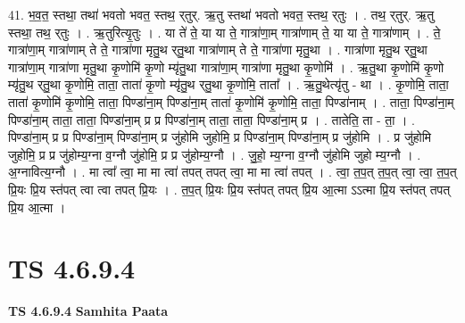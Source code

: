 \documentclass[17pt]{extarticle}
\begin{document}
41. भ॒व॒त॒ स्तथा॒ तथा॑ भवतो भवत॒ स्तथ॒ र्‌तुर्. ऋ॒तु स्तथा॑ भवतो भवत॒ स्तथ॒ र्‌तुः । . तथ॒ र्‌तुर्. ऋ॒तु स्तथा॒ तथ॒ र्‌तुः । . ऋ॒तुरित्यृ॒तुः । . या ते॑ ते॒ या या ते॒ गात्रा॑णा॒म् गात्रा॑णाम् ते॒ या या ते॒ गात्रा॑णाम् । . ते॒ गात्रा॑णा॒म् गात्रा॑णाम् ते ते॒ गात्रा॑णा मृतु॒थ र्‌तु॒था गात्रा॑णाम् ते ते॒ गात्रा॑णा मृतु॒था । . गात्रा॑णा मृतु॒थ र्‌तु॒था गात्रा॑णा॒म् गात्रा॑णा मृतु॒था कृ॒णोमि॑ कृ॒णो म्यृ॑तु॒था गात्रा॑णा॒म् गात्रा॑णा मृतु॒था कृ॒णोमि॑ । . ऋ॒तु॒था कृ॒णोमि॑ कृ॒णो म्यृ॑तु॒थ र्‌तु॒था कृ॒णोमि॒ ताता॒ ताता॑ कृ॒णो म्यृ॑तु॒थ र्‌तु॒था कृ॒णोमि॒ ताता᳚ । . ऋ॒तु॒थेत्यृ॑तु - था । . कृ॒णोमि॒ ताता॒ ताता॑ कृ॒णोमि॑ कृ॒णोमि॒ ताता॒ पिण्डा॑ना॒म् पिण्डा॑ना॒म् ताता॑ कृ॒णोमि॑ कृ॒णोमि॒ ताता॒ पिण्डा॑नाम् । . ताता॒ पिण्डा॑ना॒म् पिण्डा॑ना॒म् ताता॒ ताता॒ पिण्डा॑ना॒म् प्र प्र पिण्डा॑ना॒म् ताता॒ ताता॒ पिण्डा॑ना॒म् प्र । . तातेति॒ ता - ता॒ । . पिण्डा॑ना॒म् प्र प्र पिण्डा॑ना॒म् पिण्डा॑ना॒म् प्र जु॑होमि जुहोमि॒ प्र पिण्डा॑ना॒म् पिण्डा॑ना॒म् प्र जु॑होमि । . प्र जु॑होमि जुहोमि॒ प्र प्र जु॑होम्य॒ग्ना व॒ग्नौ जु॑होमि॒ प्र प्र जु॑होम्य॒ग्नौ । . जु॒हो॒ म्य॒ग्ना व॒ग्नौ जु॑होमि जुहो म्य॒ग्नौ । . अ॒ग्नावित्य॒ग्नौ । . मा त्वा᳚ त्वा॒ मा मा त्वा॑ तपत् तपत् त्वा॒ मा मा त्वा॑ तपत् । . त्वा॒ त॒प॒त् त॒प॒त् त्वा॒ त्वा॒ त॒प॒त् प्रि॒यः प्रि॒य स्त॑पत् त्वा त्वा तपत् प्रि॒यः । . त॒प॒त् प्रि॒यः प्रि॒य स्त॑पत् तपत् प्रि॒य आ॒त्मा ऽऽत्मा प्रि॒य स्त॑पत् तपत् प्रि॒य आ॒त्मा । \newline
\pagebreak
{}

\section{ TS 4.6.9.4 }

\textbf{TS 4.6.9.4 } \newline
\textbf{Samhita Paata} \newline
\end{document}
